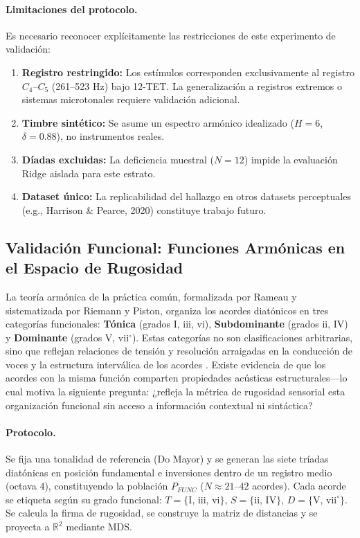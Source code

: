 \paragraph{Limitaciones del protocolo.}
Es necesario reconocer explícitamente las restricciones de este experimento de validación:
\begin{enumerate}
\item \textbf{Registro restringido:} Los estímulos corresponden exclusivamente al registro $C_4$--$C_5$ (261--523 Hz) bajo 12-TET. La generalización a registros extremos o sistemas microtonales requiere validación adicional.
\item \textbf{Timbre sintético:} Se asume un espectro armónico idealizado ($H=6$, $\delta=0.88$), no instrumentos reales.
\item \textbf{Díadas excluidas:} La deficiencia muestral ($N=12$) impide la evaluación Ridge aislada para este estrato.
\item \textbf{Dataset único:} La replicabilidad del hallazgo en otros datasets perceptuales (e.g., Harrison \& Pearce, 2020) constituye trabajo futuro.
\end{enumerate}

\subsection{Validación Funcional: Funciones Armónicas en el Espacio de Rugosidad}
\label{subsec:validacion_funcional}

La teoría armónica de la práctica común, formalizada por Rameau y sistematizada por Riemann y Piston, organiza los acordes diatónicos en tres categorías funcionales: \textbf{Tónica} (grados I, iii, vi), \textbf{Subdominante} (grados ii, IV) y \textbf{Dominante} (grados V, vii$^\circ$). Estas categorías no son clasificaciones arbitrarias, sino que reflejan relaciones de tensión y resolución arraigadas en la conducción de voces y la estructura interválica de los acordes \cite{tymoczkoGeometryMusicalChords2006, lerdahlTonalPitchSpace1988}. Existe evidencia de que los acordes con la misma función comparten propiedades acústicas estructurales---lo cual motiva la siguiente pregunta: ¿refleja la métrica de rugosidad sensorial esta organización funcional sin acceso a información contextual ni sintáctica?

\paragraph{Protocolo.}
Se fija una tonalidad de referencia (Do Mayor) y se generan las siete tríadas diatónicas en posición fundamental e inversiones dentro de un registro medio (octava 4), constituyendo la población $P_{FUNC}$ ($N \approx 21$--$42$ acordes). Cada acorde se etiqueta según su grado funcional: $T = \{\text{I, iii, vi}\}$, $S = \{\text{ii, IV}\}$, $D = \{\text{V, vii}^\circ\}$. Se calcula la firma de rugosidad, se construye la matriz de distancias y se proyecta a $\mathbb{R}^2$ mediante MDS.

